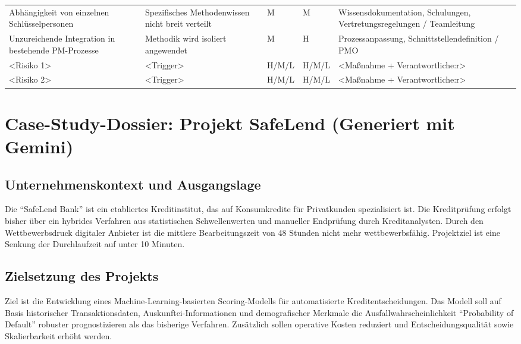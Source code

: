 \begin{longtable}{@{}p{3.0cm}p{3.2cm}p{2.1cm}p{2.1cm}p{4.2cm}@{}}
Abhängigkeit von einzelnen Schlüsselpersonen 
& Spezifisches Methodenwissen nicht breit verteilt 
& M 
& M 
& Wissensdokumentation, Schulungen, Vertretungsregelungen / Teamleitung \\

Unzureichende Integration in bestehende PM-Prozesse 
& Methodik wird isoliert angewendet 
& M 
& H 
& Prozessanpassung, Schnittstellendefinition / PMO \\

\textless Risiko 1\textgreater & \textless Trigger\textgreater & H/M/L & H/M/L & \textless Maßnahme + Verantwortliche:r\textgreater \\
\textless Risiko 2\textgreater & \textless Trigger\textgreater & H/M/L & H/M/L & \textless Maßnahme + Verantwortliche:r\textgreater \\
\bottomrule
\end{longtable}

\section{Case-Study-Dossier: Projekt SafeLend (Generiert mit Gemini)}

\subsection{Unternehmenskontext und Ausgangslage}
Die \enquote{SafeLend Bank} ist ein etabliertes Kreditinstitut,
das auf Konsumkredite für Privatkunden spezialisiert ist.
Die Kreditprüfung erfolgt bisher über ein hybrides Verfahren
aus statistischen Schwellenwerten und manueller Endprüfung
durch Kreditanalysten.
Durch den Wettbewerbsdruck digitaler Anbieter ist die mittlere
Bearbeitungszeit von 48 Stunden nicht mehr wettbewerbsfähig.
Projektziel ist eine Senkung der Durchlaufzeit auf unter 10 Minuten.

\subsection{Zielsetzung des Projekts}
Ziel ist die Entwicklung eines Machine-Learning-basierten
Scoring-Modells für automatisierte Kreditentscheidungen.
Das Modell soll auf Basis historischer Transaktionsdaten,
Auskunftei-Informationen und demografischer Merkmale
die Ausfallwahrscheinlichkeit
\enquote{Probability of Default} robuster prognostizieren
als das bisherige Verfahren.
Zusätzlich sollen operative Kosten reduziert
und Entscheidungsqualität sowie Skalierbarkeit erhöht werden.

